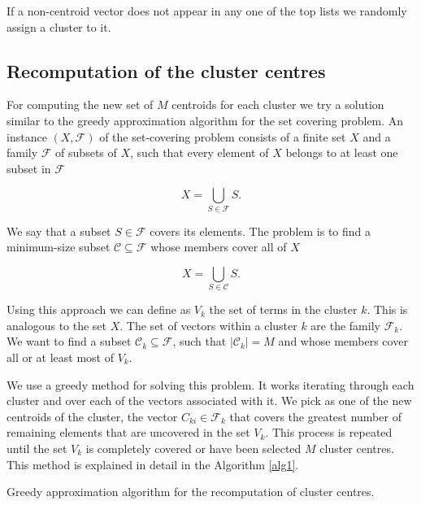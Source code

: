 \documentclass[runningheads]{llncs}
\begin{document}
If a non-centroid vector does not appear in any one of the
top lists we randomly assign a cluster to it.


\subsection{Recomputation of the cluster centres}

For computing the new set of $M$ centroids for each cluster
we try a solution similar to the greedy approximation
algorithm  for the set covering problem.
An instance $(X, \mathcal{F})$ of the set-covering problem consists of
a finite set $X$ and a family $\mathcal{F}$ of subsets of $X$, such that 
every element of $X$ belongs to at least one subset in $\mathcal{F}$

\[
X = \bigcup_{S\in \mathcal{F}} S.
\]

We say that a subset $S\in \mathcal{F}$ covers its elements. The problem is to find a minimum-size subset $\mathcal{C} \subseteq \mathcal{F}$ whose members cover all of $X$

\[
X = \bigcup_{S \in \mathcal{C}} S.
\]

Using this approach we can define as $V_k$ the set of terms in the cluster $k$. This is analogous to the set $X$. The set of vectors within a cluster $k$ are the family $\mathcal{F}_k$. We want to find a subset $\mathcal{C}_k \subseteq \mathcal{F}$, such that $|\mathcal{C}_k| = M$ and whose members cover all or at least most of $V_k$.

We use a greedy method for solving this problem. It works iterating
through each cluster and over each of the vectors associated with it. We pick as one of the new centroids of the cluster, the vector $C_{ki} \in \mathcal{F}_k$ that covers the greatest number of remaining elements that are uncovered in the set $V_k$. This process is repeated until the set
$V_k$ is completely covered or have been selected $M$ cluster centres.
This method is explained in detail in the Algorithm \ref{alg1}.

\begin{algorithm}
\begin{algorithmic}
\ENDWHILE
\ENDFOR

\caption{Greedy approximation algorithm for the recomputation of cluster centres.\label{alg1}}
\end{algorithmic}
\end{algorithm}
\end{document}
